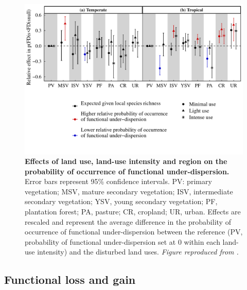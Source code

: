 \begin{figure}[h!]
\centering
\includegraphics[scale=0.75]{figures/Chapter_FD/Figure4_new}
\caption[Effects of land use, land-use intensity and region on the probability of occurrence of functional under-dispersion.]{\textbf{Effects of land use, land-use intensity and region on the probability of occurrence of functional under-dispersion.} Error bars represent 95\% confidence intervals. PV: primary vegetation; MSV, mature secondary vegetation; ISV, intermediate secondary vegetation; YSV, young secondary vegetation; PF, plantation forest; PA, pasture; CR, cropland; UR, urban. Effects are rescaled and represent the average difference in the probability of occurrence of functional under-dispersion between the reference (PV, probability of functional under-dispersion set at 0 within each land-use intensity) and the disturbed land uses. \textit{Figure reproduced from \citet{Etard2022}.}}
\label{chap3_fig4}
\end{figure}

\subsection{Functional loss and gain}

